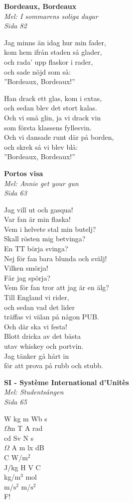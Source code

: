 \documentclass[10pt]{article}
\newenvironment{song}[2]{
	\textbf{#1}\\
	\emph{#2}\par
	\vspace{-1mm}
}{
	\vspace{2mm}
}
\begin{document}
\begin{multicols*}{2}
\vfill
\columnbreak

\begin{song}{Bordeaux, Bordeaux}{Mel: I sommarens soliga dagar\\Sida 82}
	Jag minns än idag hur min fader,\\
	kom hem ifrån staden så glader,\\
	och rada’ upp flaskor i rader,\\
	och sade nöjd som så:\\
	”Bordeaux, Bordeaux!”

	Han drack ett glas, kom i extas,\\
	och sedan blev det stort kalas.\\
	Och vi små glin, ja vi drack vin\\
	som första klassens fyllesvin.\\
	Och vi dansade runt där på borden,\\
	och skrek så vi blev blå:\\
	”Bordeaux, Bordeaux!”
\end{song}

\begin{song}{Portos visa}{Mel: Annie get your gun\\Sida 63}
	Jag vill ut och gasqua!\\
	Var fan är min flaska!\\
	Vem i helvete stal min butelj?\\
	Skall rösten mig betvinga?\\
	En TT börja svinga?\\
	Nej för fan bara blunda och svälj!\\
	Vilken smörja!\\
	Får jag spörja?\\
	Vem för fan tror att jag är en älg?\\
	Till England vi rider,\\
	och sedan vad det lider\\
	träffas vi välan på någon PUB.\\
	Och där ska vi festa!\\
	Blott dricka av det bästa\\
	utav whiskey och portvin.\\
	Jag tänker gå hårt in\\
	för att prova på rubb och stubb.
\end{song}

\begin{song}{SI - Système International d'Unitès}{Mel: Studentsången\\Sida 65}
	W kg m Wb s\\
	$\Omega$m T A rad\\
	cd Sv N s\\
	$\Omega$ A m lx dB\\
	\degree C W/$\text{m}^2$\\
	J/kg H V C\\
	kg/$\text{m}^3$ mol\\
	m/$\text{s}^2$ m/$\text{s}^2$\\
	F!
\end{song}


\end{multicols*}
\end{document}
